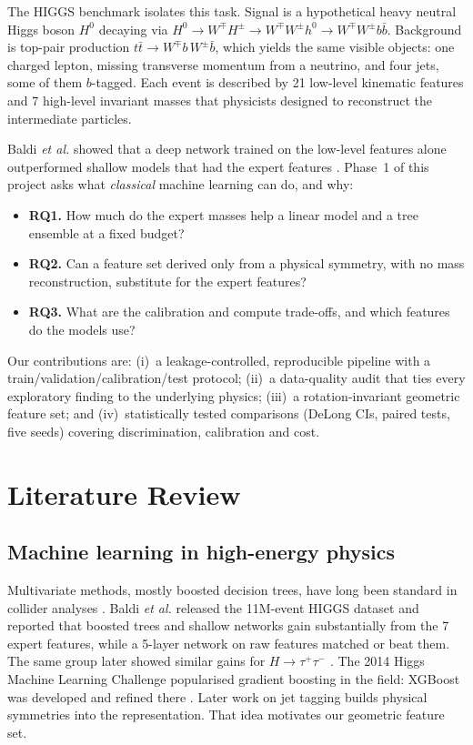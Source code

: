 \documentclass[conference]{IEEEtran}
\begin{document}
The HIGGS benchmark \cite{baldi2014searching,uci_higgs} isolates this task. Signal is a
hypothetical heavy neutral Higgs boson $H^0$ decaying via $H^0\!\to\!W^\mp H^\pm\!\to\!W^\mp W^\pm h^0\!\to\!W^\mp W^\pm b\bar b$.
Background is top-pair production $t\bar t\!\to\!W^\mp b\,W^\pm\bar b$, which yields the same
visible objects: one charged lepton, missing transverse momentum from a neutrino, and four jets,
some of them $b$-tagged. Each event is described by 21 low-level kinematic features and 7 high-level
invariant masses that physicists designed to reconstruct the intermediate particles.

Baldi \emph{et al.} showed that a deep network trained on the low-level features alone outperformed
shallow models that had the expert features \cite{baldi2014searching}. Phase~1 of this project asks
what \emph{classical} machine learning can do, and why:
\begin{itemize}
\item \textbf{RQ1.} How much do the expert masses help a linear model and a tree ensemble at a fixed budget?
\item \textbf{RQ2.} Can a feature set derived only from a physical symmetry, with no mass
reconstruction, substitute for the expert features?
\item \textbf{RQ3.} What are the calibration and compute trade-offs, and which features do the models use?
\end{itemize}
Our contributions are: (i)~a leakage-controlled, reproducible pipeline with a train/validation/calibration/test protocol;
(ii)~a data-quality audit that ties every exploratory finding to the underlying physics;
(iii)~a rotation-invariant geometric feature set; and (iv)~statistically tested comparisons
(DeLong CIs, paired tests, five seeds) covering discrimination, calibration and cost.

\section{Literature Review}\label{sec:lit}
\subsection{Machine learning in high-energy physics}
Multivariate methods, mostly boosted decision trees, have long been standard in collider analyses
\cite{guest2018deep,radovic2018machine}. Baldi \emph{et al.} \cite{baldi2014searching} released the
11M-event HIGGS dataset and reported that boosted trees and shallow networks gain substantially from
the 7 expert features, while a 5-layer network on raw features matched or beat them. The same group
later showed similar gains for $H\!\to\!\tau^+\tau^-$ \cite{baldi2015tautau}. The 2014 Higgs Machine
Learning Challenge \cite{adambourdarios2015higgsml} popularised gradient boosting in the field: XGBoost
was developed and refined there \cite{chen2015higgsboosted}. Later work on jet tagging
\cite{kasieczka2019toptagging,komiske2019energyflow} builds physical symmetries into the
representation. That idea motivates our geometric feature set.
\end{document}
